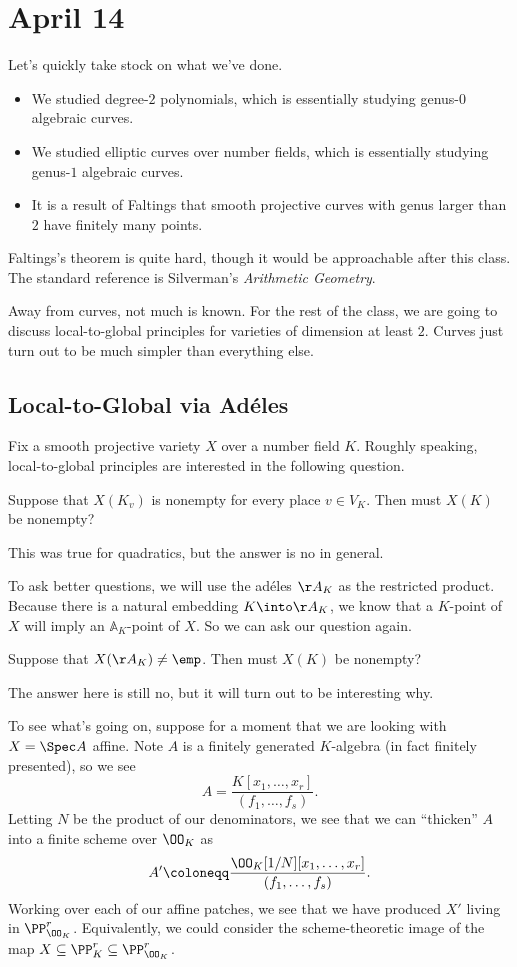 \documentclass[../notes.tex]{subfiles}
\begin{document}
\section{April 14}

Let's quickly take stock on what we've done.
\begin{itemize}
	\item We studied degree-$2$ polynomials, which is essentially studying genus-$0$ algebraic curves.
	\item We studied elliptic curves over number fields, which is essentially studying genus-$1$ algebraic curves.
	\item It is a result of Faltings that smooth projective curves with genus larger than $2$ have finitely many points.
\end{itemize}
\begin{remark}
	Faltings's theorem is quite hard, though it would be approachable after this class. The standard reference is Silverman's \textit{Arithmetic Geometry}.
\end{remark}
Away from curves, not much is known. For the rest of the class, we are going to discuss local-to-global principles for varieties of dimension at least $2$. Curves just turn out to be much simpler than everything else.

\subsection{Local-to-Global via Ad\'eles}
Fix a smooth projective variety $X$ over a number field $K$. Roughly speaking, local-to-global principles are interested in the following question.
\begin{ques}
	Suppose that $X(K_v)$ is nonempty for every place $v\in V_K$. Then must $X(K)$ be nonempty?
\end{ques}
This was true for quadratics, but the answer is no in general.

To ask better questions, we will use the ad\'eles $\AA_K$ as the restricted product. Because there is a natural embedding $K\into\AA_K$, we know that a $K$-point of $X$ will imply an $\mathbb A_K$-point of $X$. So we can ask our question again.
\begin{ques}
	Suppose that $X(\AA_K)\ne\emp$. Then must $X(K)$ be nonempty?
\end{ques}
The answer here is still no, but it will turn out to be interesting why.

To see what's going on, suppose for a moment that we are looking with $X=\Spec A$ affine. Note $A$ is a finitely generated $K$-algebra (in fact finitely presented), so we see
\[A=\frac{K[x_1,\ldots,x_r]}{(f_1,\ldots,f_s)}.\]
Letting $N$ be the product of our denominators, we see that we can ``thicken'' $A$ into a finite scheme over $\OO_K$ as
\[A'\coloneqq\frac{\OO_K[1/N][x_1,\ldots,x_r]}{(f_1,\ldots,f_s)}.\]
Working over each of our affine patches, we see that we have produced $X'$ living in $\PP^r_{\OO_K}$. Equivalently, we could consider the scheme-theoretic image of the map $X\subseteq\PP^r_K\subseteq\PP^r_{\OO_K}$.
\end{document}
